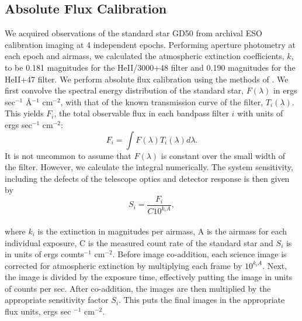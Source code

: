 \documentclass[twocolumn]{aastex61}
\begin{document}
\subsection{Absolute Flux Calibration}
We acquired observations of the standard star GD50 from archival ESO calibration imaging at 4 independent epochs. Performing aperture photometry at each epoch and airmass, we calculated the atmospheric extinction coefficients, $k$, to be 0.181 magnitudes for the HeII/3000+48 filter and 0.190 magnitudes for the HeII+47 filter. We perform absolute flux calibration using the methods of \cite{Jacoby1987}. We first convolve the spectral energy distribution of the standard star, $F(\lambda)$ in ergs sec$^{-1}$ \AA$^{-1}$ cm$^{-2}$, with that of the known transmission curve of the filter, $T_{i}(\lambda)$. This yields $F_i$, the total observable flux in each bandpass filter $i$ with units of ergs sec$^{-1}$ cm$^{-2}$:
\begin{equation*}
F_{i}=\int F(\lambda)T_{i}(\lambda)d\lambda.
\end{equation*}
It is not uncommon to assume that $F(\lambda)$ is constant over the small width of the filter. 
However, we calculate the integral numerically.
The system sensitivity, including the defects of the telescope optics and detector response is then given by
\begin{equation*}
S_{i}=\dfrac{F_{i}}{C10^{k_{i}A}},
\end{equation*}\\
where $k_i$ is the extinction in magnitudes per airmass, A is the airmass for each individual exposure, C is the measured count rate of the standard star and $S_i$ is in units of ergs counts$^{-1}$ cm$^{-2}$. Before image co-addition, each science image is corrected for atmospheric extinction by multiplying each frame by $10^{k_{i}A}$. Next, the image is divided by the exposure time, effectively putting the image in units of counts per sec. After co-addition, the images are then multiplied by the appropriate sensitivity factor $S_{i}$. This puts the final images in the appropriate flux units, ergs sec $^{-1}$ cm$^{-2}$.
\end{document}
